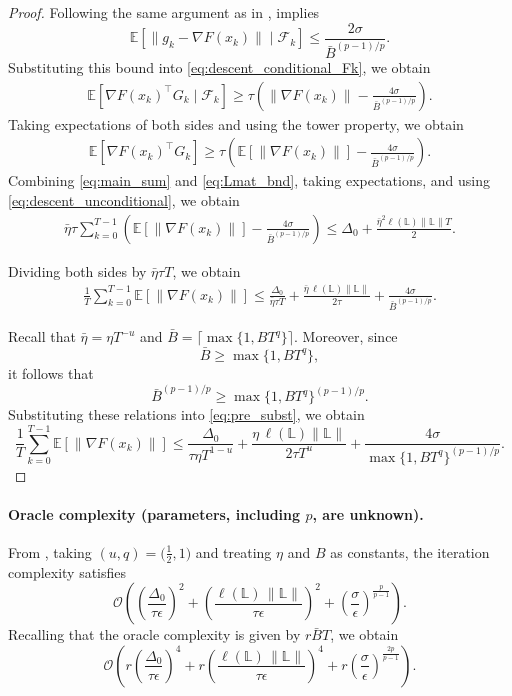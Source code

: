 \documentclass[10pt]{article}
\begin{document}
\begin{proof}
Following the same argument as in \citet{huebler2025}, 
implies
\[
\mathbb{E}\!\left[\|g_k-\nabla F(x_k)\| \mid \mathcal{F}_k\right]
\le
\frac{2\sigma}{\bar{B}^{(p-1)/p}}.
\]
Substituting this bound into \eqref{eq:descent_conditional_Fk}, we obtain
\begin{align}
\mathbb{E}\!\left[\nabla F(x_k)^\top G_k \mid \mathcal{F}_k\right]
\ge
\tau\left(
\|\nabla F(x_k)\|
-
\frac{4\sigma}{\bar{B}^{(p-1)/p}}
\right).
\label{eq:descent_conditional_final}
\end{align}
Taking expectations of both sides and using the tower property, we obtain
\begin{align}
\mathbb{E}\!\left[\nabla F(x_k)^\top G_k\right]
\ge
\tau\left(
\mathbb{E}\!\left[\|\nabla F(x_k)\|\right]
-
\frac{4\sigma}{\bar{B}^{(p-1)/p}}
\right).
\label{eq:descent_unconditional}
\end{align}
Combining \eqref{eq:main_sum} and \eqref{eq:Lmat_bnd}, taking expectations,
and using \eqref{eq:descent_unconditional}, we obtain
\begin{align*}
\bar{\eta}\tau
\sum_{k=0}^{T-1}
\left(
\mathbb{E}[\|\nabla F(x_k)\|]
-
\frac{4\sigma}{\bar{B}^{(p-1)/p}}
\right)
\le
\Delta_0
+
\frac{\bar{\eta}^2\ell(\mathbb{L})\|\mathbb{L}\|T}{2}.
\end{align*}

Dividing both sides by $\bar{\eta}\tau T$, we obtain
\begin{align}
\frac{1}{T}
\sum_{k=0}^{T-1}
\mathbb{E}[\|\nabla F(x_k)\|]
\le
\frac{\Delta_0}{\bar{\eta}\tau T}
+ \frac{\bar{\eta}\,\ell(\mathbb{L})\|\mathbb{L}\|}{2\tau}
+ \frac{4\sigma}{\bar{B}^{(p-1)/p}}.
\label{eq:pre_subst}
\end{align}

Recall that $\bar{\eta}=\eta T^{-u}$ and
$\bar{B}=\lceil \max\{1,BT^q\}\rceil$.
Moreover, since
\[
\bar{B}
\ge
\max\{1,BT^q\},
\]
it follows that
\[
\bar{B}^{(p-1)/p}
\ge
\max\{1,BT^q\}^{(p-1)/p}.
\]
Substituting these relations into \eqref{eq:pre_subst}, we obtain
\[
\frac{1}{T}
\sum_{k=0}^{T-1}
\mathbb{E}[\|\nabla F(x_k)\|]
\le
\frac{\Delta_0}{\tau\eta T^{1-u}}
+ \frac{\eta\,\ell(\mathbb{L})\|\mathbb{L}\|}{2\tau T^u}
+ \frac{4\sigma}{\max\{1,BT^q\}^{(p-1)/p}}.
\]
\end{proof}




\paragraph{Oracle complexity (parameters, including $p$, are unknown).}
From , taking $(u,q)=\bigl(\tfrac12,1\bigr)$ and treating $\eta$ and $B$ as constants,
the iteration complexity satisfies 
\[
\mathcal{O}\!\left(
\left(\frac{\Delta_0}{\tau \epsilon}\right)^{2}
+
\left(\frac{\ell(\mathbb{L})\,\|\mathbb{L}\|}{\tau \epsilon}\right)^{2}
+
\left(\frac{\sigma}{\epsilon}\right)^{\frac{p}{p-1}}
\right).
\]
Recalling that the oracle complexity is given by $r\bar{B}T$,
we obtain
\[
\mathcal{O}\!\left(
r\left(\frac{\Delta_0}{\tau \epsilon}\right)^{4}
+
r\left(\frac{\ell(\mathbb{L})\,\|\mathbb{L}\|}{\tau \epsilon}\right)^{4}
+
r\left(\frac{\sigma}{\epsilon}\right)^{\frac{2p}{p-1}}
\right).
\]
\end{document}
